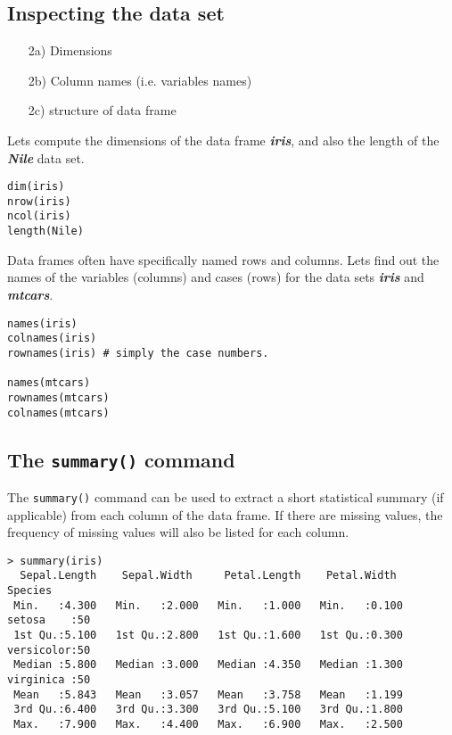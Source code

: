 \documentclass[12pt]{article}
\begin{document}
\newpage
\subsection*{Inspecting the data set}

\begin{itemize}
\item[2a)] Dimensions
\item[2b)] Column names (i.e. variables names)
\item[2c)] structure of data frame
\end{itemize}
Lets compute the dimensions of the data frame \textit{\textbf{iris}}, and also the length of the \textit{\textbf{Nile}} data set.
\begin{framed}
\begin{verbatim}
dim(iris)
nrow(iris)
ncol(iris)
length(Nile)
\end{verbatim}
\end{framed}

Data frames often have specifically named rows and columns. 
Lets find out the names of the variables (columns) and cases (rows) for the data sets \textit{\textbf{iris}} and \textit{\textbf{mtcars}}.

\begin{framed}
\begin{verbatim}
names(iris)
colnames(iris)
rownames(iris) # simply the case numbers.

names(mtcars)
rownames(mtcars)
colnames(mtcars)
\end{verbatim}
\end{framed}

\newpage
\subsection*{The \texttt{summary()} command}
The \texttt{summary()} command can be used to extract a short statistical summary (if applicable) from each column of the data frame. 
If there are missing values, the frequency of missing values will also be listed for each column.

\begin{verbatim}
> summary(iris)
  Sepal.Length    Sepal.Width     Petal.Length    Petal.Width          Species  
 Min.   :4.300   Min.   :2.000   Min.   :1.000   Min.   :0.100   setosa    :50  
 1st Qu.:5.100   1st Qu.:2.800   1st Qu.:1.600   1st Qu.:0.300   versicolor:50  
 Median :5.800   Median :3.000   Median :4.350   Median :1.300   virginica :50  
 Mean   :5.843   Mean   :3.057   Mean   :3.758   Mean   :1.199                  
 3rd Qu.:6.400   3rd Qu.:3.300   3rd Qu.:5.100   3rd Qu.:1.800                  
 Max.   :7.900   Max.   :4.400   Max.   :6.900   Max.   :2.500                
\end{verbatim}
\end{document}
